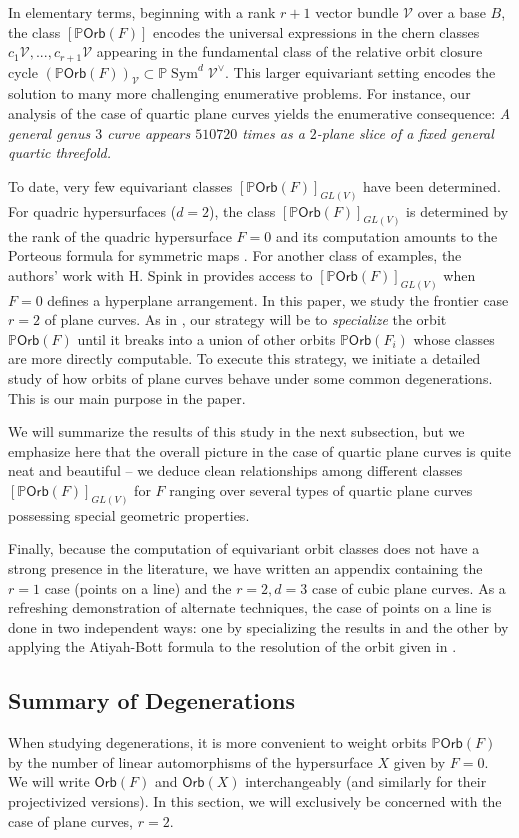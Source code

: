 \documentclass[12 pt, reqno]{amsart}
\theoremstyle{definition}
\newcommand{\on}{\operatorname}
\newcommand{\mb}{\mathbb}
\newcommand{\mc}{\mathcal}
\renewcommand{\P}{\mb{P}}
\newcommand{\Orb}{\mathsf{Orb}}
\begin{document}
In elementary terms, beginning with a rank $r+1$ vector bundle
$\mc{V}$ over a base $B$, the class $[\P \Orb(F)]$ encodes the
universal expressions in the chern classes
$c_1\mathcal{V}, ..., c_{r+1}\mathcal{V}$ appearing in the fundamental
class of the relative orbit closure cycle
$(\P \Orb(F))_{\mathcal{V}} \subset \P
\on{Sym}^{d}\mathcal{V}^{\vee}$. This larger equivariant setting
encodes the solution to many more challenging enumerative
problems. For instance, our analysis of the case of quartic plane
curves yields the enumerative consequence: {\sl A general genus $3$
  curve appears $510720$ times as a $2$-plane slice of a fixed general
  quartic threefold.}

To date, very few equivariant classes $[\P \Orb(F)]_{GL(V)}$ have been
determined. For quadric hypersurfaces ($d=2$), the class
$[\P \Orb(F)]_{GL(V)}$ is determined by the rank of the quadric
hypersurface $F=0$ and its computation amounts to the Porteous formula
for symmetric maps \cite{HT84}. For another class of examples, the
authors' work with H. Spink in \cite{FML} provides access to
$[\P \Orb(F)]_{GL(V)}$ when $F=0$ defines a hyperplane arrangement. In
this paper, we study the frontier case $r=2$ of plane curves. As in
\cite{FML}, our strategy will be to {\sl specialize} the orbit
$\P \Orb(F)$ until it breaks into a union of other orbits
$\P \Orb(F_i)$ whose classes are more directly computable. To execute
this strategy, we initiate a detailed study of how orbits of plane
curves behave under some common degenerations.  This is our main
purpose in the paper.
 
We will summarize the results of this study in the next subsection,
but we emphasize here that the overall picture in the case of quartic
plane curves is quite neat and beautiful -- we deduce clean
relationships among different classes $[\P \Orb(F)]_{GL(V)}$ for $F$
ranging over several types of quartic plane curves possessing special
geometric properties.


Finally, because the computation of equivariant orbit classes does not
have a strong presence in the literature, we have written an appendix
containing the $r=1$ case (points on a line) and the $r=2, d=3$ case
of cubic plane curves. As a refreshing demonstration of alternate
techniques, the case of points on a line is done in two independent
ways: one by specializing the results in \cite{FML} and the other by
applying the Atiyah-Bott formula to the resolution of the orbit given
in \cite{AFpoint}.

\subsection{Summary of Degenerations}
\label{sec:degeneration}
When studying degenerations, it is more convenient to weight orbits
$\P \Orb(F)$ by the number of linear automorphisms of the hypersurface
$X$ given by $F=0$.  We will write $\Orb(F)$ and $\Orb(X)$
interchangeably (and similarly for their projectivized versions).  In
this section, we will exclusively be concerned with the case of plane
curves, $r=2$.
\end{document}
